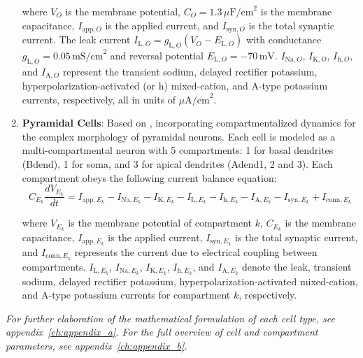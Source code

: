 \begin{enumerate}
          where \(V_O\) is the membrane potential, \(C_O = 1.3 \, \mu\text{F/cm}^2\) is
          the membrane capacitance, \(I_{\text{app},O}\) is the applied current, and
          \(I_{\text{syn},O}\) is the total synaptic current. The leak current
          \(I_{\text{L},O} = g_{\text{L},O}(V_O - E_{\text{L},O})\) with conductance
          \(g_{\text{L},O} = 0.05 \, \text{mS/cm}^2\) and reversal potential
          \(E_{\text{L},O} = -70 \, \text{mV}\). \(I_{\text{Na},O}\), \(I_{\text{K},O}\),
          \(I_{\text{h},O}\), and \(I_{\text{A},O}\) represent the transient sodium,
          delayed rectifier potassium, hyperpolarization-activated (or h) mixed-cation,
          and A-type potassium currents, respectively, all in units of
          \(\mu\text{A/cm}^2\).
    \item \textbf{Pyramidal Cells}: Based on \textcite{miglioreDendriticIhSelectivelyBlocks2004},
          incorporating compartmentalized dynamics for the complex morphology of pyramidal neurons.
          Each cell is modeled as a multi-compartmental neuron with 5 compartments: 1 for basal dendrites (Bdend),
          1 for soma, and 3 for apical dendrites (Adend1, 2 and 3). Each compartment obeys the following current balance equation:
          \begin{equation}
              C_{E_k} \frac{dV_{E_k}}{dt} = I_{\text{app},E_k} - I_{\text{Na},E_k} - I_{\text{K},E_k} - I_{\text{L},E_k} - I_{\text{h},E_k} - I_{\text{A},E_k} - I_{\text{syn},E_k} + I_{\text{conn},E_k}
          \end{equation}

          where \(V_{E_k}\) is the membrane potential of compartment \(k\), \(C_{E_k}\)
          is the membrane capacitance, \(I_{\text{app},E_k}\) is the applied current,
          \(I_{\text{syn},E_k}\) is the total synaptic current, and
          \(I_{\text{conn},E_k}\) represents the current due to electrical coupling
          between compartments. \(I_{\text{L},E_k}\), \(I_{\text{Na},E_k}\),
          \(I_{\text{K},E_k}\), \(I_{\text{h},E_k}\), and \(I_{\text{A},E_k}\) denote the
          leak, transient sodium, delayed rectifier potassium,
          hyperpolarization-activated mixed-cation, and A-type potassium currents for
          compartment \(k\), respectively.
\end{enumerate}

\noindent
\textit{For further elaboration of the mathematical formulation of each cell type, see appendix~\ref{ch:appendix_a}. For the full overview of cell and compartment parameters, see appendix~\ref{ch:appendix_b}.}

